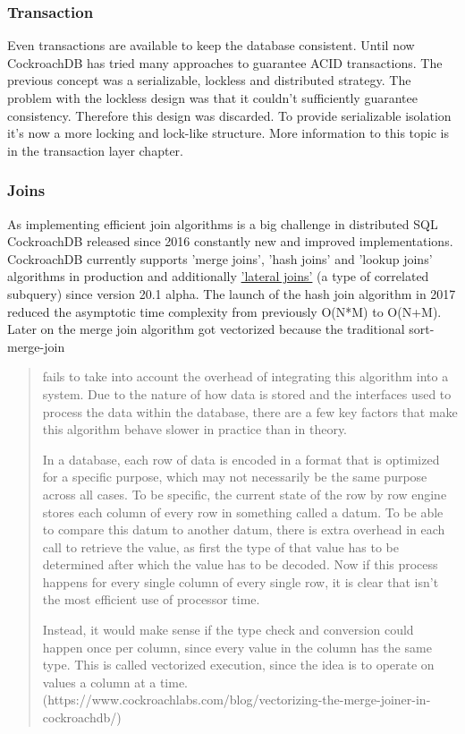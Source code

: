 \documentclass[12pt,a4paper]{article}
\begin{document}
\subsubsection{Transaction}
Even transactions are available to keep the database consistent. Until now CockroachDB has tried many approaches to guarantee
ACID transactions. The previous concept was a serializable, lockless and distributed strategy. 
The problem with the lockless design was that it couldn't sufficiently guarantee consistency. Therefore this design was 
discarded. To provide serializable isolation it's now a more locking and lock-like structure. 
More information to this topic is in the transaction layer chapter.

\subsubsection{Joins}
As implementing efficient join algorithms is a big challenge in distributed SQL CockroachDB released since 2016 
constantly new and improved implementations.
CockroachDB currently supports ’merge joins’, ’hash joins’ and ’lookup joins' algorithms in production and additionally
\href{https://www.cockroachlabs.com/blog/using-lateral-joins-in-the-cockroachdb-20-1-alpha/}{’lateral joins’} (a type of correlated subquery) since version 20.1 alpha.
The launch of the hash join algorithm in 2017 reduced the asymptotic time complexity from previously O(N*M) to O(N+M).
Later on the merge join algorithm got vectorized because the traditional sort-merge-join \begin{quote} fails to take into 
account the overhead of integrating this algorithm into a system. Due to the nature of how data is stored and the interfaces 
used to process the data within the database, there are a few key factors that make this algorithm behave slower in practice 
than in theory. 

In a database, each row of data is encoded in a format that is optimized for a specific purpose, which may 
not necessarily be the same purpose across all cases. To be specific, the current state of the row by row engine stores each 
column of every row in something called a datum. To be able to compare this datum to another datum, there is extra overhead 
in each call to retrieve the value, as first the type of that value has to be determined after which the value has to be 
decoded. Now if this process happens for every single column of every single row, it is clear that isn’t the most efficient 
use of processor time.

Instead, it would make sense if the type check and conversion could happen once per column, since every value in the column 
has the same type. This is called vectorized execution, since the idea is to operate on values a column at a time.
(https://www.cockroachlabs.com/blog/vectorizing-the-merge-joiner-in-cockroachdb/)
\end{quote}
\end{document}
